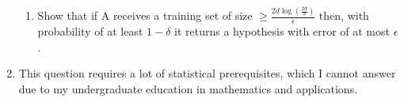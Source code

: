 \documentclass[]{book}
\theoremstyle{definition}
\begin{document}
\begin{enumerate}
\begin{enumerate}[I]
  
  \item Show that if A receives a training set of size $\geq \frac{2d \log (\frac{2d}{\delta}) }{\epsilon}$ then, with probability of at least $1-\delta$ it returns a hypothesis with error of at most $\epsilon$ .
  
\end{enumerate}

\item This question requires a lot of statistical prerequisites, which I cannot answer due to my undergraduate education in mathematics and applications.
\end{enumerate}
\end{document}
